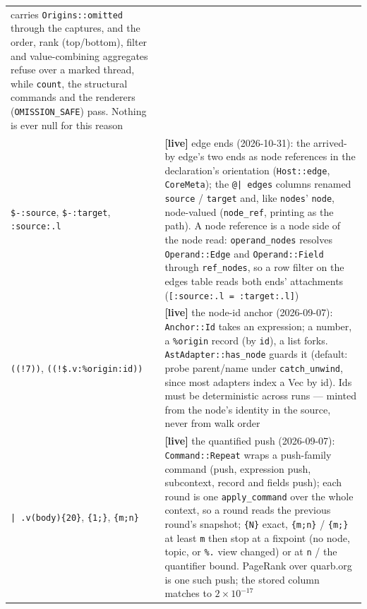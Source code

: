 \documentclass{report}
\newcommand{\live}{\textbf{\textcolor{blue!60!black}{[live]}}\xspace}
\begin{document}
\begin{xltabular}{\textwidth}{>{\raggedright\arraybackslash}p{0.36\textwidth} X}
    carries \texttt{Origins::omitted} through the captures, and the
    order, rank (top/bottom), filter and value-combining aggregates
    refuse over a marked thread, while \texttt{count}, the structural
    commands and the renderers (\texttt{OMISSION\_SAFE}) pass. Nothing
    is ever null for this reason \\
\texttt{\$-:source}, \texttt{\$-:target}, \texttt{:source:.l}
  & \live edge ends (2026-10-31): the arrived-by edge's two ends as
    node references in the declaration's orientation
    (\texttt{Host::edge}, \texttt{CoreMeta}); the \texttt{@| edges}
    columns renamed \texttt{source} / \texttt{target} and, like
    \texttt{nodes}' \texttt{node}, node-valued (\texttt{node\_ref},
    printing as the path). A node reference is a node side of the
    node read: \texttt{operand\_nodes} resolves \texttt{Operand::Edge}
    and \texttt{Operand::Field} through \texttt{ref\_nodes}, so a row
    filter on the edges table reads both ends' attachments
    (\texttt{[:source:.l = :target:.l]}) \\
\texttt{((!7))}, \texttt{((!\$.v:\%origin:id))}
  & \live the node-id anchor (2026-09-07): \texttt{Anchor::Id} takes
    an expression; a number, a \texttt{\%origin} record (by
    \texttt{id}), a list forks. \texttt{AstAdapter::has\_node}
    guards it (default: probe parent/name under
    \texttt{catch\_unwind}, since most adapters index a Vec by
    id). Ids must be deterministic across runs --- minted from the
    node's identity in the source, never from walk order \\
\texttt{| .v(body)\{20\}}, \texttt{\{1;\}}, \texttt{\{m;n\}}
  & \live the quantified push (2026-09-07): \texttt{Command::Repeat}
    wraps a push-family command (push, expression push, subcontext,
    record and fields push); each round is one \texttt{apply\_command}
    over the whole context, so a round reads the previous round's
    snapshot; \texttt{\{N\}} exact, \texttt{\{m;n\}} /
    \texttt{\{m;\}} at least \texttt{m} then stop at a fixpoint (no
    node, topic, or \texttt{\%.} view changed) or at \texttt{n} /
    the quantifier bound. PageRank over quarb.org is one such push;
    the stored column matches to $2\times10^{-17}$ \\
\bottomrule
\end{xltabular}

\medskip
\end{document}
